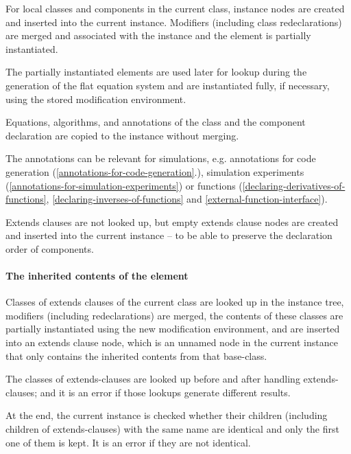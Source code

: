 For local classes and components in the current class, instance nodes
are created and inserted into the current instance. Modifiers (including
class redeclarations) are merged and associated with the instance and
the element is partially instantiated.

\begin{nonnormative}
The partially instantiated elements are used later for lookup during the generation of the flat equation system and are instantiated fully, if necessary, using the
stored modification environment.
\end{nonnormative}

Equations, algorithms, and annotations of the class and the component
declaration are copied to the instance without merging.

\begin{nonnormative}
The annotations can be relevant for simulations, e.g. annotations for code generation (\autoref{annotations-for-code-generation}.), simulation experiments
(\autoref{annotations-for-simulation-experiments}) or functions (\autoref{declaring-derivatives-of-functions}, \autoref{declaring-inverses-of-functions} and \autoref{external-function-interface}).
\end{nonnormative}

Extends clauses are not looked up, but empty extends clause nodes are
created and inserted into the current instance -- to be able to preserve
the declaration order of components.

\paragraph*{The inherited contents of the element}

Classes of extends clauses of the current class are looked up in the
instance tree, modifiers (including redeclarations) are merged, the
contents of these classes are partially instantiated using the new
modification environment, and are inserted into an extends clause node,
which is an unnamed node in the current instance that only contains the
inherited contents from that base-class.

The classes of extends-clauses are looked up before and after handling
extends-clauses; and it is an error if those lookups generate different
results.

At the end, the current instance is checked whether their children
(including children of extends-clauses) with the same name are identical
and only the first one of them is kept.  It is an error if they are not identical.

